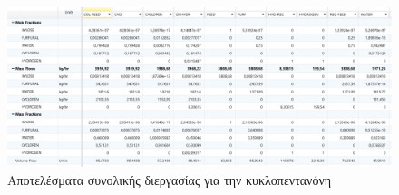 \documentclass[11pt]{article}
\begin{document}
\begin{figure}[htbp]
\centering
\includegraphics[width=.9\linewidth]{Παράρτημα/2023-01-13_18-10-19_screenshot.png}
\caption{Αποτελέσματα συνολικής διεργασίας για την κυκλοπεντανόνη}
\end{figure}
\end{document}
